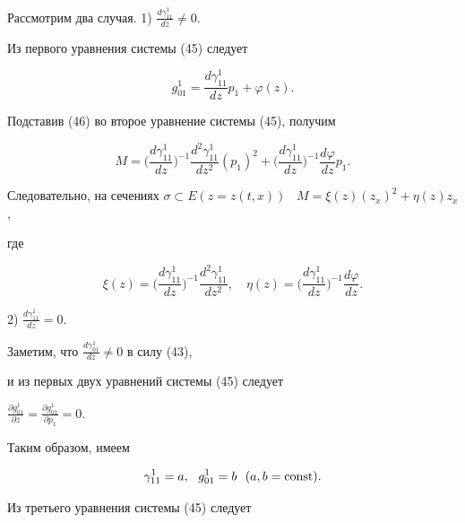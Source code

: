 Рассмотрим два случая. 1) $\frac{{d\gamma_{11}^1}}{{dz}} \ne 0$.


Из первого уравнения системы (45) следует


\begin{equation}


g_{01}^1=\frac{{d\gamma_{11}^1}}{{dz}} p_1+\varphi (z).


\end{equation}


Подставив (46) во второе уравнение системы (45), получим


$$


M=\bigg({\frac{{d\gamma_{11}^1}}{{dz}}}\bigg)^{-1}


\frac{{d^2 \gamma_{11}^1}}{{dz^2}} ({p_1})^2+


\bigg({\frac{{d\gamma_{11}^1}}{{dz}}}\bigg)^{-1}


\frac{{d\varphi}}{{dz}} p_1.


$$


Следовательно, на сечениях $\sigma \subset E


({z=z ({t,x})})$ \ $M=\xi (z) ({z_x})^2+\eta (z) z_x$,


где


$$


\xi (z)= \bigg({\frac{{d\gamma_{11}^1}}{{dz}}}\bigg)^{-1} 


\frac{{d^2 \gamma_{11}^1}}{{dz^2}},\quad


\eta (z)= \bigg({\frac{{d\gamma_{11}^1}}{{dz}}}\bigg)^{-1} 


\frac{{d\varphi}}{{dz}}.


$$





2) $\frac{{d\gamma_{11}^1}}{{dz}}=0$.


Заметим, что $\frac{{d\gamma_{01}^1}}{{dz}} \ne 0$ в силу (43),


и из первых двух уравнений системы (45) следует


$\frac{{\partial g_{01}^1}}{{\partial z}}=


\frac{{\partial g_{01}^1}}{{\partial p_1}}=0$.


Таким образом, имеем


\begin{equation}


\gamma_{11}^1=a,\ \ g_{01}^1=b\ \ ({a,b=\const}).


\end{equation}


Из третьего уравнения системы (45) следует


